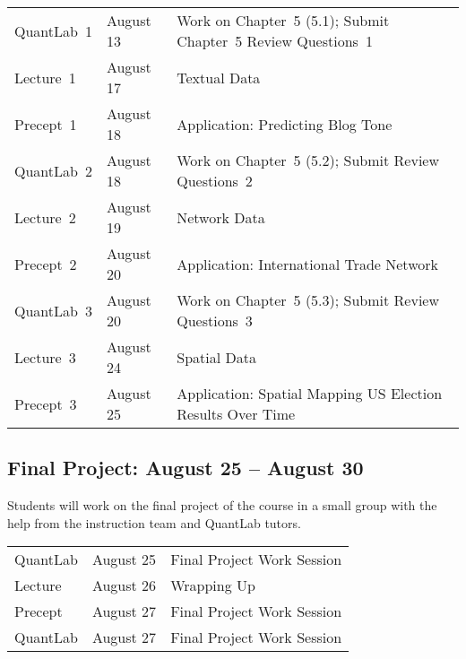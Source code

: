 \documentclass[11pt,letterpaper]{article}
\begin{document}
\begin{center}
  \begin{tabular}{lll}
    \hline
    QuantLab~1 & August 13 & Work on Chapter~5 (5.1); Submit Chapter~5 Review Questions~1 \\
    Lecture~1   & August 17 & Textual Data \\
    Precept~1   & August 18 & Application: Predicting Blog Tone\\
    QuantLab~2 & August 18 & Work on Chapter~5 (5.2); Submit Review Questions~2 \\
    Lecture~2  & August 19 & Network Data \\
    Precept~2  & August 20 & Application: International Trade Network \\
    QuantLab~3 & August 20 & Work on Chapter~5 (5.3); Submit Review Questions~3 \\
    Lecture~3  & August 24 & Spatial Data \\
    Precept~3  & August 25 & Application: Spatial Mapping US Election Results Over Time
    \\
    \hline
  \end{tabular}
\end{center}

\bigskip 
\subsection*{Final Project: August 25 -- August 30}

Students will work on the final project of the course in a small group
with the help from the instruction team and QuantLab tutors.

\begin{center}
  \begin{tabular}{lll}
    \hline
    QuantLab & August 25 & Final Project Work Session \\
    Lecture  & August 26 & Wrapping Up \\
    Precept  & August 27 & Final Project Work Session \\
    QuantLab & August 27 & Final Project Work Session \\
		\hline
	\end{tabular}
\end{center}
\end{document}
